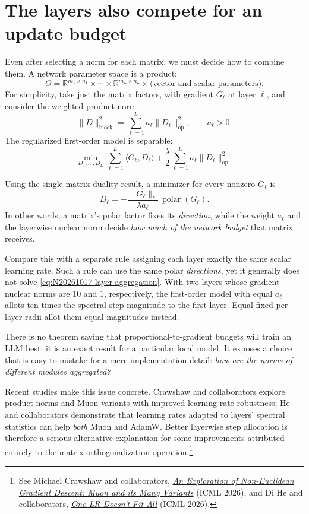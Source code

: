 \section{The layers also compete for an update budget}

Even after selecting a norm for each matrix, we must decide how to combine them.  A network parameter space is a product:
\[
 \Theta=\mathbb R^{m_1\times n_1}\times\cdots\times
         \mathbb R^{m_L\times n_L}\times
         \text{(vector and scalar parameters)}.
\]
For simplicity, take just the matrix factors, with gradient \(G_\ell\) at layer \(\ell\), and consider the weighted product norm
\[
 \|D\|_{\mathrm{block}}^2
 =\sum_{\ell=1}^L a_\ell\|D_\ell\|_{\mathrm{op}}^2,
 \qquad a_\ell>0.
\]
The regularized first-order model is separable:
\begin{equation}
 \min_{D_1,\ldots,D_L}
 \sum_{\ell=1}^L\langle G_\ell,D_\ell\rangle+
 \frac{\lambda}{2}\sum_{\ell=1}^L
 a_\ell\|D_\ell\|_{\mathrm{op}}^2.
 \label{eq:N20261017-layer-aggregation}
\end{equation}

Using the single-matrix duality result, a minimizer for every nonzero \(G_\ell\) is
\begin{equation}
 D_\ell=-\frac{\|G_\ell\|_*}{\lambda a_\ell}\,
                \operatorname{polar}(G_\ell).
 \label{eq:N20261017-block-solution}
\end{equation}
In other words, a matrix's polar factor fixes its \emph{direction}, while the weight \(a_\ell\) and the layerwise nuclear norm decide \emph{how much of the network budget} that matrix receives.

Compare this with a separate rule assigning each layer exactly the same scalar learning rate.  Such a rule can use the same polar \emph{directions}, yet it generally does not solve \eqref{eq:N20261017-layer-aggregation}.  With two layers whose gradient nuclear norms are \(10\) and \(1\), respectively, the first-order model with equal \(a_\ell\) allots ten times the spectral step magnitude to the first layer.  Equal fixed per-layer radii allot them equal magnitudes instead.

There is no theorem saying that proportional-to-gradient budgets will train an LLM best; it is an exact result for a particular local model.  It exposes a choice that is easy to mistake for a mere implementation detail: \emph{how are the norms of different modules aggregated?}

Recent studies make this issue concrete.  Crawshaw and collaborators explore product norms and Muon variants with improved learning-rate robustness; He and collaborators demonstrate that learning rates adapted to layers' spectral statistics can help \emph{both} Muon and AdamW.  Better layerwise step allocation is therefore a serious alternative explanation for some improvements attributed entirely to the matrix orthogonalization operation.\footnote{See Michael Crawshaw and collaborators, \href{https://proceedings.mlr.press/v306/crawshaw26a.html}{\emph{An Exploration of Non-Euclidean Gradient Descent: Muon and its Many Variants}} (ICML 2026), and Di He and collaborators, \href{https://proceedings.mlr.press/v306/he26ak.html}{\emph{One LR Doesn't Fit All}} (ICML 2026).}

